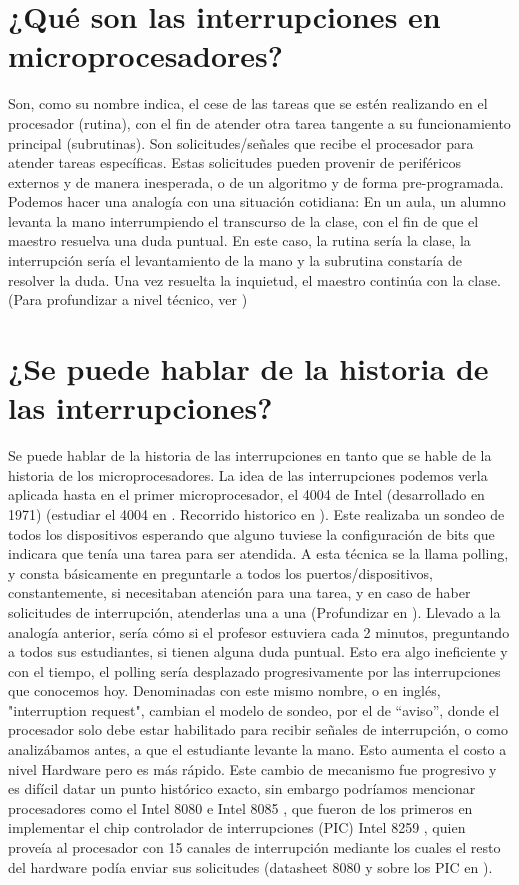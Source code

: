 \documentclass[12pt]{article}
\begin{document}
\begin{multicols}{2}

\section*{¿Qué son las interrupciones en microprocesadores?}
Son, como su nombre indica, el cese de las tareas que se estén realizando en el procesador (rutina), con el fin de atender otra tarea tangente a su funcionamiento principal (subrutinas). Son solicitudes/señales que recibe el procesador para atender tareas específicas. Estas solicitudes pueden provenir de periféricos externos y de manera inesperada, o de un algoritmo y de forma pre-programada. Podemos hacer una analogía con una situación cotidiana: En un aula, un alumno levanta la mano interrumpiendo el transcurso de la clase, con el fin de que el maestro resuelva una duda puntual. En este caso, la rutina sería la clase, la interrupción sería el levantamiento de la mano y la subrutina constaría de resolver la duda. Una vez resuelta la inquietud, el maestro continúa con la clase. (Para profundizar a nivel técnico, ver \cite{Ruz})
\section*{¿Se puede hablar de la historia de las interrupciones?}
Se puede hablar de la historia de las interrupciones en tanto que se hable de la historia de los microprocesadores. La idea de las interrupciones podemos verla aplicada hasta en el primer microprocesador, el 4004 de Intel (desarrollado en 1971) (estudiar el 4004 en \cite{Shi}. Recorrido historico en \cite{Mor}). Este realizaba un sondeo de todos los dispositivos esperando que alguno tuviese la configuración de bits que indicara que tenía una tarea para ser atendida. A esta técnica se la llama polling, y consta básicamente en preguntarle a todos los puertos/dispositivos, constantemente, si necesitaban atención para una tarea, y en caso de haber solicitudes de interrupción, atenderlas una a una (Profundizar en \cite{Chi}). Llevado a la analogía anterior, sería cómo si el profesor estuviera cada 2 minutos, preguntando a todos sus estudiantes, si tienen alguna duda puntual. Esto era algo ineficiente y con el tiempo, el polling sería desplazado progresivamente por las interrupciones que conocemos hoy. Denominadas con este mismo nombre, o en inglés, "interruption request", cambian el modelo de sondeo, por el de “aviso”, donde el procesador solo debe estar habilitado para recibir señales de interrupción, o como analizábamos antes, a que el estudiante levante la mano. Esto aumenta el costo a nivel Hardware pero es más rápido. Este cambio de mecanismo fue progresivo y es difícil datar un punto histórico exacto, sin embargo podríamos mencionar procesadores como el Intel 8080 e Intel 8085 \cite{Qui}, que fueron de los primeros en implementar el chip controlador de interrupciones (PIC) Intel 8259 \cite{Int2}, quien proveía al procesador con 15 canales de interrupción mediante los cuales el resto del hardware podía enviar sus solicitudes (datasheet 8080 \cite{Int} y sobre los PIC en \cite{Wai}).

\end{multicols}
\end{document}
